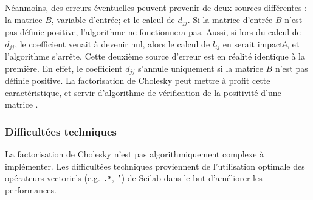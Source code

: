 \documentclass[3p, twocolumn]{elsarticle}
\begin{document}
Néanmoins, des erreurs éventuelles peuvent provenir de deux sources différentes : la matrice $B$, variable d'entrée; et le calcul de $d_{jj}$. Si la matrice d'entrée $B$ n'est pas définie positive, l'algorithme ne fonctionnera pas. Aussi, si lors du calcul de $d_{jj}$, le coefficient venait à devenir nul, alors le calcul de $l_{ij}$ en serait impacté, et l'algorithme s'arrête. Cette deuxième source d'erreur est en réalité identique à la première. En effet, le coefficient $d_{jj}$ s'annule uniquement si la matrice $B$ n'est pas définie positive. La factorisation de Cholesky peut mettre à profit cette caractéristique, et servir d'algorithme de vérification de la positivité d'une matrice \cite{art:McSweeney_2017}.

\subsubsection{Difficultées techniques}
La factorisation de Cholesky n'est pas algorithmiquement complexe à implémenter. Les difficultées techniques proviennent de l'utilisation optimale des opérateurs vectoriels (e.g. \texttt{.*}, \texttt{'}) de Scilab dans le but d'améliorer les performances.
\end{document}
